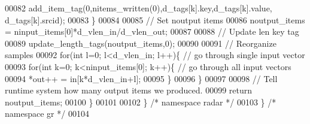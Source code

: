 \begin{DoxyCode}
00082             add\_item\_tag(0,nitems\_written(0),d_tags[k].key,d_tags[k].value,
      d_tags[k].srcid);
00083         \}
00084         
00085         \textcolor{comment}{// Set noutput items}
00086         noutput\_items = ninput\_items[0]*d_vlen_in/d_vlen_out;
00087         
00088         \textcolor{comment}{// Update len key tag}
00089         update\_length\_tags(noutput\_items,0);
00090         
00091         \textcolor{comment}{// Reorganize samples}
00092         \textcolor{keywordflow}{for}(\textcolor{keywordtype}{int} l=0; l<d_vlen_in; l++)\{ \textcolor{comment}{// go through single input vector}
00093             \textcolor{keywordflow}{for}(\textcolor{keywordtype}{int} k=0; k<ninput\_items[0]; k++)\{ \textcolor{comment}{// go through all input vectors}
00094                 *out++ = in[k*d\_vlen\_in+l];
00095             \}
00096         \}
00097 
00098         \textcolor{comment}{// Tell runtime system how many output items we produced.}
00099         \textcolor{keywordflow}{return} noutput\_items;
00100     \}
00101 
00102   \} \textcolor{comment}{/* namespace radar */}
00103 \} \textcolor{comment}{/* namespace gr */}
00104 
\end{DoxyCode}
